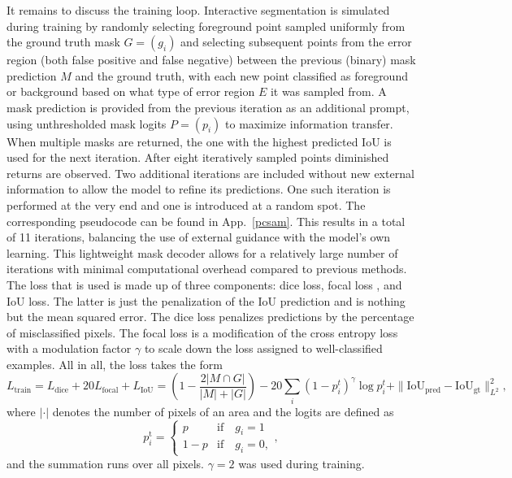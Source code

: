 It remains to discuss the training loop. Interactive segmentation is simulated during training by randomly selecting foreground point sampled uniformly from the ground truth mask $G = (g_{i})$ and selecting subsequent points from the error region (both false positive and false negative) between the previous (binary) mask prediction $M$ and the ground truth, with each new point classified as foreground or background based on what type of error region $E$ it was sampled from. A mask prediction is provided from the previous iteration as an additional prompt, using unthresholded mask logits $P = (p_{i})$ to maximize information transfer. When multiple masks are returned, the one with the highest predicted IoU is used for the next iteration. After eight iteratively sampled points diminished returns are observed. Two additional iterations are included without new external information to allow the model to refine its predictions. One such iteration is performed at the very end and one is introduced at a random spot. The corresponding pseudocode can be found in App.~\ref{pcsam}. This results in a total of 11 iterations, balancing the use of external guidance with the model's own learning. This lightweight mask decoder allows for a relatively large number of iterations with minimal computational overhead compared to previous methods. The loss that is used is made up of three components: dice loss, focal loss \cite{liu2009otsu}, and IoU loss. The latter is just the penalization of the IoU prediction and is nothing but the mean squared error. The dice loss penalizes predictions by the percentage of misclassified pixels. The focal loss is a modification of the cross entropy loss with a modulation factor $\gamma$ to scale down the loss assigned to well-classified examples. All in all, the loss takes the form
\begin{equation}\label{samloss}
	L_{\text{train}} = L_{\text{dice}} + 20L_{\text{focal}}+ L_{\text{IoU}} = \left(1 - \dfrac{2|M \cap G|}{|M| + |G|}\right) - 20\sum_{i}(1-p^t_i)^{\gamma}\log p^t_i + \|\text{IoU}_{\text{pred}} - \text{IoU}_{\text{gt}}\|_{L^2}^{2},
\end{equation}
where $|\cdot|$ denotes the number of pixels of an area and the logits are defined as
\begin{equation*}
	p_i^\text{t}=\begin{cases}p&\text{if}\quad g_i=1\\1-p&\text{if}\quad g_{i}=0,\end{cases},
\end{equation*}
and the summation runs over all pixels. $\gamma = 2$ was used during training.


